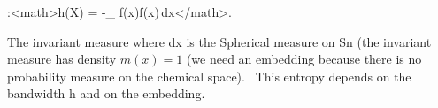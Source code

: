:<math>h(X) = -\int_ f(x)\log f(x)\,dx</math>.


The invariant measure where dx is the Spherical measure on Sn (the invariant measure has density $m(x)=1$ (we need an embedding because there is no probability measure on the chemical space). 
This entropy depends on the bandwidth h and on the embedding.
